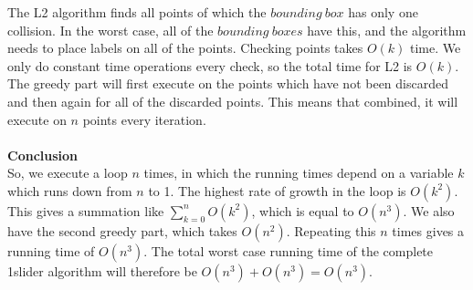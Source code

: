 \documentclass[crop=false,a4paper,oneside,11pt]{article}
\begin{document}
The L2 algorithm finds all points of which the $bounding \ box$ has only one collision. In the worst case, all of the $bounding \ boxes$ have this, and the algorithm needs to place labels on all of the points. Checking points takes $O(k)$ time. We only do constant time operations every check, so the total time for L2 is $O(k)$. \\
The greedy part will first execute on the points which have not been discarded and then again for all of the discarded points. This means that combined, it will execute on $n$ points every iteration.  
\\ \\
\textbf{Conclusion} \\
So, we execute a loop $n$ times, in which the running times depend on a variable $k$ which runs down from $n$ to 1. The highest rate of growth in the loop is $O(k^2)$. This gives a summation like $\sum_{k=0}^n O(k^2)$, which is equal to $O(n^3)$. We also have the second greedy part, which takes $O(n^2)$. Repeating this $n$ times gives a running time of $O(n^3)$.
The total worst case running time of the complete 1slider algorithm will therefore be $O(n^3) + O(n^3) = O(n^3)$.
\end{document}
